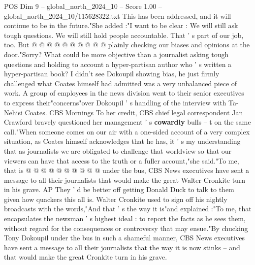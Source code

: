\begin{textsample}{POS Dim 9 – global\_north\_2024\_10 – Score 1.00 – global\_north\_2024\_10/115628322.txt}
This has been addressed, and it will continue to be in the future."She added :"I want to be clear : We will still ask tough questions.
We will still hold people accountable.
That ' s part of our job, too.
But @ @ @ @ @ @ @ @ @ @ plainly checking our biases and opinions at the door."Sorry?
What could be more objective than a journalist asking tough questions and holding to account a hyper-partisan author who ' s written a hyper-partisan book?
I didn't see Dokoupil showing bias, he just firmly challenged what Coates himself had admitted was a very unbalanced piece of work.
A group of employees in the news division went to their senior executives to express their"concerns"over Dokoupil ' s handling of the interview with Ta-Nehisi Coates.
CBS Mornings To her credit, CBS chief legal correspondent Jan Crawford bravely questioned her management ' s \textbf{cowardly} bulls -- t on the same call."When someone comes on our air with a one-sided account of a very complex situation, as Coates himself acknowledges that he has, it ' s my understanding that as journalists we are obligated to challenge that worldview so that our viewers can have that access to the truth or a fuller account,"she said."To me, that is @ @ @ @ @ @ @ @ @ @ under the bus, CBS News executives have sent a message to all their journalists that would make the great Walter Cronkite turn in his grave.
AP They ' d be better off getting Donald Duck to talk to them given how quackers this all is.
Walter Cronkite used to sign off his nightly broadcasts with the words,"And that ' s the way it is"and explained :"To me, that encapsulates the newsman ' s highest ideal : to report the facts as he sees them, without regard for the consequences or controversy that may ensue."By chucking Tony Dokoupil under the bus in such a shameful manner, CBS News executives have sent a message to all their journalists that the way it is now stinks -- and that would make the great Cronkite turn in his grave.

\end{textsample}
